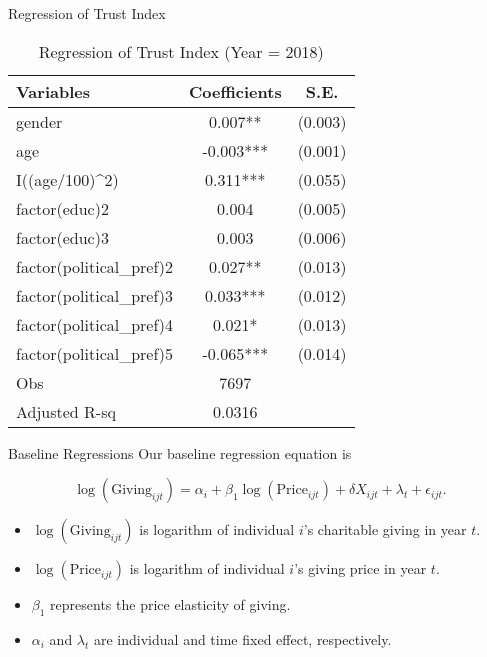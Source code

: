 \documentclass[
  ignorenonframetext,
]{beamer}
\providecommand{\tightlist}{%
  \setlength{\itemsep}{0pt}\setlength{\parskip}{0pt}}
\begin{document}
\begin{frame}{Regression of Trust Index}
\protect\hypertarget{regression-of-trust-index}{}
\begin{table}

\caption{\label{tab:kableTabTrustReg}Regression of Trust Index (Year = 2018)}
\centering
\begin{tabular}[t]{lcc}
\toprule
Variables & Coefficients & S.E.\\
\midrule
gender & 0.007** & (0.003)\\
age & -0.003*** & (0.001)\\
I((age/100)\textasciicircum{}2) & 0.311*** & (0.055)\\
factor(educ)2 & 0.004 & (0.005)\\
factor(educ)3 & 0.003 & (0.006)\\
factor(political\_pref)2 & 0.027** & (0.013)\\
factor(political\_pref)3 & 0.033*** & (0.012)\\
factor(political\_pref)4 & 0.021* & (0.013)\\
factor(political\_pref)5 & -0.065*** & (0.014)\\
Obs & 7697 & \\
Adjusted R-sq & 0.0316 & \\
\bottomrule
\end{tabular}
\end{table}
\end{frame}

\begin{frame}{Baseline Regressions}
\protect\hypertarget{baseline-regressions}{}
Our baseline regression equation is

\[
    \log(\text{Giving}_{ijt}) = 
    \alpha_i + \beta_1 \log(\text{Price}_{ijt}) + \delta X_{ijt} + \lambda_t + \epsilon_{ijt}.
\]

\begin{itemize}
\tightlist
\item
  \(\log(\text{Giving}_{ijt})\) is logarithm of individual \(i\)'s
  charitable giving in year \(t\).
\item
  \(\log(\text{Price}_{ijt})\) is logarithm of individual \(i\)'s giving
  price in year \(t\).
\item
  \(\beta_1\) represents the price elasticity of giving.
\item
  \(\alpha_i\) and \(\lambda_t\) are individual and time fixed effect,
  respectively.
\end{itemize}
\end{frame}
\end{document}
